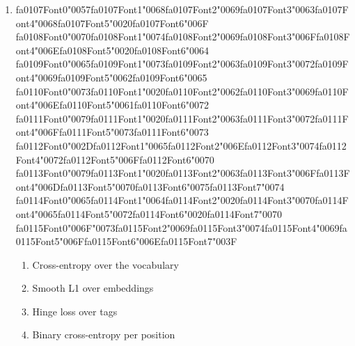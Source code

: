 \documentclass[12pt]{article}
\begin{document}
\begin{enumerate}[label=Q\arabic*.]
 \item {\csname fa0107Font0\endcsname\char"0057}{\csname fa0107Font1\endcsname\char"0068}{\csname fa0107Font2\endcsname\char"0069}{\csname fa0107Font3\endcsname\char"0063}{\csname fa0107Font4\endcsname\char"0068}{\csname fa0107Font5\endcsname\char"0020}{\csname fa0107Font6\endcsname\char"006F} {\csname fa0108Font0\endcsname\char"0070}{\csname fa0108Font1\endcsname\char"0074}{\csname fa0108Font2\endcsname\char"0069}{\csname fa0108Font3\endcsname\char"006F}{\csname fa0108Font4\endcsname\char"006E}{\csname fa0108Font5\endcsname\char"0020}{\csname fa0108Font6\endcsname\char"0064} {\csname fa0109Font0\endcsname\char"0065}{\csname fa0109Font1\endcsname\char"0073}{\csname fa0109Font2\endcsname\char"0063}{\csname fa0109Font3\endcsname\char"0072}{\csname fa0109Font4\endcsname\char"0069}{\csname fa0109Font5\endcsname\char"0062}{\csname fa0109Font6\endcsname\char"0065} {\csname fa0110Font0\endcsname\char"0073}{\csname fa0110Font1\endcsname\char"0020}{\csname fa0110Font2\endcsname\char"0062}{\csname fa0110Font3\endcsname\char"0069}{\csname fa0110Font4\endcsname\char"006E}{\csname fa0110Font5\endcsname\char"0061}{\csname fa0110Font6\endcsname\char"0072} {\csname fa0111Font0\endcsname\char"0079}{\csname fa0111Font1\endcsname\char"0020}{\csname fa0111Font2\endcsname\char"0063}{\csname fa0111Font3\endcsname\char"0072}{\csname fa0111Font4\endcsname\char"006F}{\csname fa0111Font5\endcsname\char"0073}{\csname fa0111Font6\endcsname\char"0073} {\csname fa0112Font0\endcsname\char"002D}{\csname fa0112Font1\endcsname\char"0065}{\csname fa0112Font2\endcsname\char"006E}{\csname fa0112Font3\endcsname\char"0074}{\csname fa0112Font4\endcsname\char"0072}{\csname fa0112Font5\endcsname\char"006F}{\csname fa0112Font6\endcsname\char"0070} {\csname fa0113Font0\endcsname\char"0079}{\csname fa0113Font1\endcsname\char"0020}{\csname fa0113Font2\endcsname\char"0063}{\csname fa0113Font3\endcsname\char"006F}{\csname fa0113Font4\endcsname\char"006D}{\csname fa0113Font5\endcsname\char"0070}{\csname fa0113Font6\endcsname\char"0075}{\csname fa0113Font7\endcsname\char"0074} {\csname fa0114Font0\endcsname\char"0065}{\csname fa0114Font1\endcsname\char"0064}{\csname fa0114Font2\endcsname\char"0020}{\csname fa0114Font3\endcsname\char"0070}{\csname fa0114Font4\endcsname\char"0065}{\csname fa0114Font5\endcsname\char"0072}{\csname fa0114Font6\endcsname\char"0020}{\csname fa0114Font7\endcsname\char"0070} {\csname fa0115Font0\endcsname\char"006F}{\char"0073}{\csname fa0115Font2\endcsname\char"0069}{\csname fa0115Font3\endcsname\char"0074}{\csname fa0115Font4\endcsname\char"0069}{\csname fa0115Font5\endcsname\char"006F}{\csname fa0115Font6\endcsname\char"006E}{\csname fa0115Font7\endcsname\char"003F}
 \begin{enumerate}[label=(\Alph*)]
     \item Cross-entropy over the vocabulary
     \item Smooth L1 over embeddings
     \item Hinge loss over tags
     \item Binary cross-entropy per position
 \end{enumerate}
 

\end{enumerate}
\end{document}
